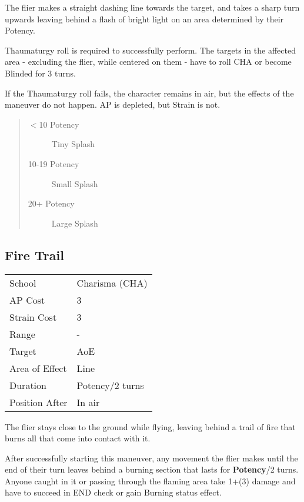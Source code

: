 \documentclass[11pt,a4paper,twocolumn]{book}
\begin{document}
\medskip

The flier makes a straight dashing line towards the target, and takes a sharp turn upwards leaving behind a flash of bright light on an area determined by their Potency.

Thaumaturgy roll is required to successfully perform. The targets in the affected area - excluding the flier, while centered on them - have to roll CHA or become Blinded for 3 turns.

If the Thaumaturgy roll fails, the character remains in air, but the effects of the maneuver do not happen. AP is depleted, but Strain is not.

\begin{quote}
	\begin{description}
		\item[$<$10 Potency] 	Tiny Splash
		\item[10-19 Potency] 	Small Splash
		\item[20+ Potency] 	Large Splash
	\end{description}
\end{quote}

\medskip
\vfill

\subsection*{Fire Trail}
{
	\begin{tabu} to 75mm{| X[l,4] | X[l,7] |}
		\hline
		School 			& Charisma (CHA) 	\\
		AP Cost	      	& 3 	 		    \\
		Strain Cost     & 3 				\\
		Range     		& - 				\\
		Target      	& AoE 				\\
		Area of Effect  & Line 	            \\
		Duration     	& Potency/2 turns 	\\
		Position After  & In air 			\\ \hline
	\end{tabu}
	
}

\medskip

The flier stays close to the ground while flying, leaving behind a trail of fire that burns all that come into contact with it. 

After successfully starting this maneuver, any movement the flier makes until the end of their turn leaves behind a burning section that lasts for \textbf{Potency}/2 turns. Anyone caught in it or passing through the flaming area take 1+(3) damage and have to succeed in END check or gain Burning status effect. 
\end{document}
